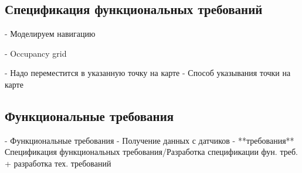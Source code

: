 
\subsection{Спецификация функциональных требований}

- Моделируем навигацию

- Occupancy grid

- Надо переместится в указанную точку на карте
- Способ указывания точки на карте



\subsection{Функциональные требования}
    - Функциональные требования
        - Получение данных с датчиков
        - **требования** Спецификация функциональных требования/Разработка
          спецификации фун. треб. + разработка тех. требований
